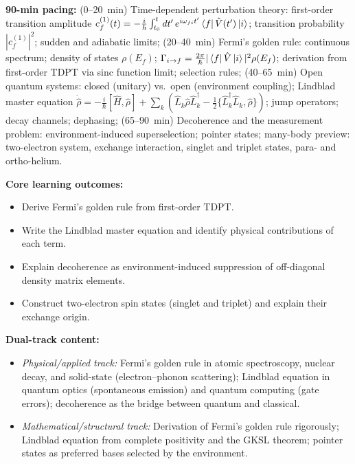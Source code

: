 \documentclass[11pt,a4paper]{article}
\begin{document}
\medskip
\begin{tcolorbox}[modulebox, title={Module~I.3 / L10: Time-Dependent PT, Open Systems, and Many-Body Preview}]
\textbf{90-min pacing:} (0--20~min) Time-dependent perturbation theory:
first-order transition amplitude
$c_f^{(1)}(t)=-\tfrac{i}{\hbar}\int_{t_0}^{t}dt'\,e^{i\omega_{fi}t'}\bra{f}\hat{V}(t')\ket{i}$;
transition probability $|c_f^{(1)}|^2$; sudden and adiabatic limits;
(20--40~min) Fermi's golden rule:
continuous spectrum; density of states $\rho(E_f)$;
$\Gamma_{i\to f}=\tfrac{2\pi}{\hbar}|\bra{f}\hat{V}\ket{i}|^2\rho(E_f)$;
derivation from first-order TDPT via sinc function limit; selection rules;
(40--65~min) Open quantum systems: closed (unitary) vs.\ open (environment coupling);
Lindblad master equation $\dot{\hat{\rho}}=-\tfrac{i}{\hbar}[\hat{H},\hat{\rho}]
+\sum_k({\hat{L}_k\hat{\rho}\hat{L}_k^\dagger-\tfrac{1}{2}\{\hat{L}_k^\dagger\hat{L}_k,\hat{\rho}\}})$;
jump operators; decay channels; dephasing;
(65--90~min) Decoherence and the measurement problem:
environment-induced superselection; pointer states;
many-body preview: two-electron system, exchange interaction, singlet and triplet states,
para- and ortho-helium.

\medskip\textbf{Core learning outcomes:}
\begin{itemize}[leftmargin=1.4em,topsep=2pt,itemsep=1pt]
  \item Derive Fermi's golden rule from first-order TDPT.
  \item Write the Lindblad master equation and identify physical contributions of each term.
  \item Explain decoherence as environment-induced suppression of off-diagonal density matrix elements.
  \item Construct two-electron spin states (singlet and triplet) and explain their exchange origin.
\end{itemize}

\medskip\textbf{Dual-track content:}
\begin{itemize}[leftmargin=1.4em,topsep=2pt,itemsep=1pt]
  \item \textit{Physical/applied track:} Fermi's golden rule in atomic spectroscopy,
    nuclear decay, and solid-state (electron--phonon scattering); Lindblad equation in
    quantum optics (spontaneous emission) and quantum computing (gate errors);
    decoherence as the bridge between quantum and classical.
  \item \textit{Mathematical/structural track:} Derivation of Fermi's golden rule rigorously;
    Lindblad equation from complete positivity and the GKSL theorem;
    pointer states as preferred bases selected by the environment.
\end{itemize}


\end{tcolorbox}
\end{document}
